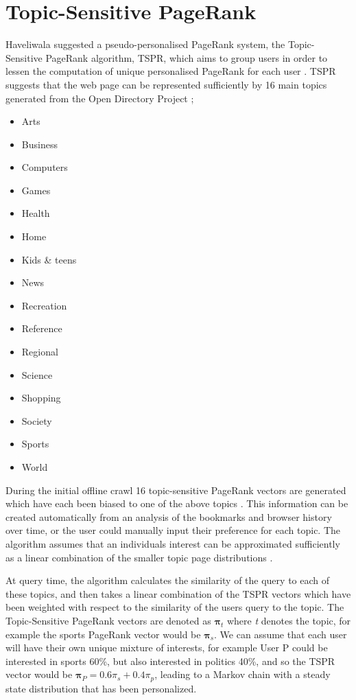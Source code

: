 \documentclass[11pt]{report}
\begin{document}
\section{Topic-Sensitive PageRank} \label{sec:TSPR}

Haveliwala suggested a pseudo-personalised PageRank system, the Topic-Sensitive PageRank algorithm, TSPR, which aims to group users in order to lessen the computation of unique personalised PageRank for each user \cite{haveliwala2002topic}. TSPR suggests that the web page can be represented sufficiently by 16 main topics generated from the Open Directory Project \cite{ODP};
\begin{multicols}{4}
\begin{itemize}
\item Arts
\item Business
\item Computers
\item Games
\item Health
\item Home
\item Kids \& teens
\item News
\item Recreation
\item Reference
\item Regional
\item Science
\item Shopping
\item Society
\item Sports
\item World
\end{itemize} 
\end{multicols}
During the initial offline crawl 16 topic-sensitive PageRank vectors are generated which have each been biased to one of the above topics \cite{haveliwala2002topic, langville}. This information can be created automatically from an analysis of the bookmarks and browser history over time, or the user could manually input their preference for each topic. The algorithm assumes that an individuals interest can be approximated sufficiently as a linear combination of the smaller topic page distributions \cite{manning}.

At query time, the algorithm calculates the similarity of the query to each of these topics, and then takes a linear combination of the TSPR vectors which have been weighted with respect to the similarity of the users query to the topic. The Topic-Sensitive PageRank vectors are denoted as $\boldsymbol{\pi}_t$ where \textit{t} denotes the topic, for example the sports PageRank vector would be $\boldsymbol{\pi}_s$. We can assume that each user will have their own unique mixture of interests, for example User P could be interested in sports 60\%, but also interested in politics 40\%, and so the TSPR vector would be $\boldsymbol{\pi}_P=0.6\pi_s+0.4\pi_p$, leading to a Markov chain with a steady state distribution that has been personalized.  
\end{document}
